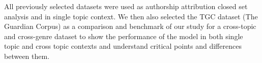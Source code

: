 All previously selected datasets were used as authorship attribution closed set analysis and in single topic context.
We then also selected the TGC dataset (The Guardian Corpus) as a comparison and benchmark of our study for a cross-topic and cross-genre dataset to show the performance of the model in both single topic and cross topic contexts and understand critical points and differences between them.
